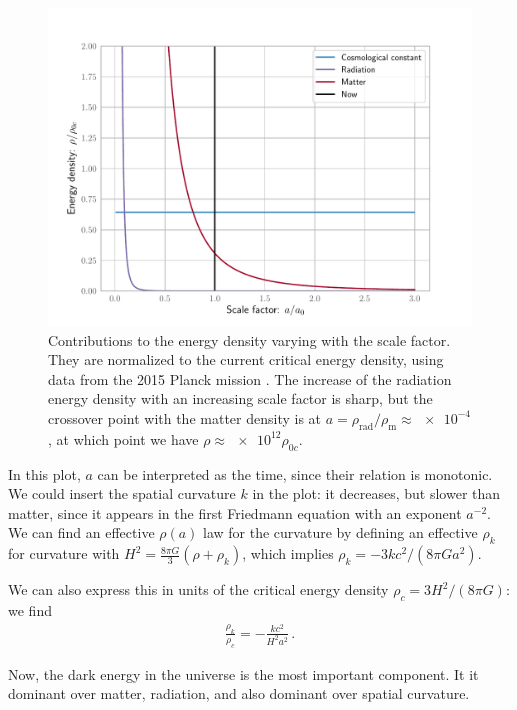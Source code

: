 \documentclass[main.tex]{subfiles}
\begin{document}
\begin{figure}[ht]
\centering
\includegraphics[width=\textwidth]{figures/global_energy_contributions.pdf}
\caption{Contributions to the energy density varying with the scale factor. They are normalized to the current critical energy density, using data from the 2015 Planck mission \cite{PlanckCollaboration:2016XIII}. The increase of the radiation energy density with an increasing scale factor is sharp, but the crossover point with the matter density is at \(a = \rho_{\text{rad}}/\rho_{\text{m}} \approx \num{e-4}\), at which point we have \(\rho \approx \num{e12} \rho_{0c}\).}
\label{fig:global_energy_contributions}
\end{figure}

In this plot, \(a\) can be interpreted as the time, since their relation is monotonic.
We could insert the spatial curvature \(k\) in the plot: it decreases, but slower than matter, since it appears in the first Friedmann equation with an exponent \(a^{-2}\).
We can find an effective \(\rho (a)\) law for the curvature by defining an effective \(\rho_{k}\) for curvature with \(H^2 = \frac{8 \pi G}{3} (\rho + \rho_{k})\), which implies \(\rho_{k} = - 3 k c^2 / (8 \pi G a^2)\). 

We can also express this in units of the critical energy density \(\rho_{c} = 3 H^2 / (8 \pi G)\): we find 
%
\begin{align} \label{eq:spatial-curvature-effective-density}
\frac{\rho_{k}}{\rho_{c}} = - \frac{kc^2}{H^2a^2}
\,.
\end{align}

Now, the dark energy in the universe is the most important component. It it dominant over matter, radiation, and also dominant over spatial curvature.
\end{document}
